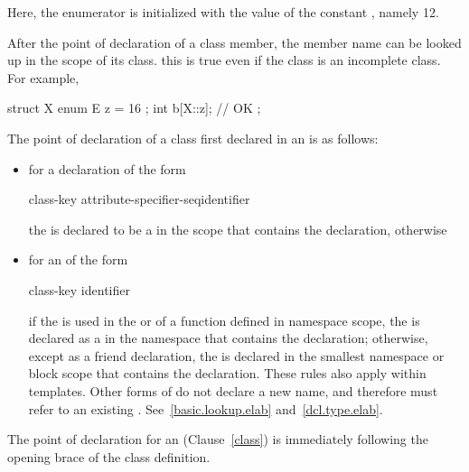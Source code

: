 Here, the enumerator  is initialized with the value of the
constant , namely 12. \exitexample

\pnum
After the point of declaration of a class member, the member name can be
looked up in the scope of its class. \enternote
{}%
this is true even if the class is an incomplete class. For example,

\begin{codeblock}
struct X {
  enum E { z = 16 };
  int b[X::z];      // OK
};
\end{codeblock}
\exitnote 

\pnum
The point of declaration of a class first declared in an
 is as follows:

\begin{itemize}
\item for a declaration of the form

\begin{ncbnf}
class-key attribute-specifier-seq\opt identifier \terminal{;}
\end{ncbnf}

the  is declared to be a
 in the scope that contains the declaration,
otherwise
\item for an  of the form

\begin{ncbnf}
class-key identifier
\end{ncbnf}

if the
 is used in the
 or 
of a function defined in namespace scope, the  is
declared as a  in the namespace that contains the
declaration; otherwise, except as a friend declaration, the
 is declared in the smallest namespace or block
scope that contains the declaration. \enternote
These rules also apply within templates. \exitnote \enternote Other
forms of  do not declare a new name,
and therefore must refer to an existing .
See~\ref{basic.lookup.elab} and~\ref{dcl.type.elab}. \exitnote
\end{itemize}

\pnum
The point of declaration for an
 (Clause~\ref{class}) is immediately following
the opening brace of the class definition.

